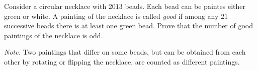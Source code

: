 Consider a circular necklace with $\displaystyle{2013}$ beads. Each bead can be paintes either green or white. A painting of the necklace is called  \textit{good} if among any $\displaystyle{21}$ successive beads there is at least one green bead. Prove that the number of good paintings of the necklace is odd.

\textit{Note.} Two paintings that differ on some beads, but can be obtained from each other by rotating or flipping the necklace, are counted as different paintings.

